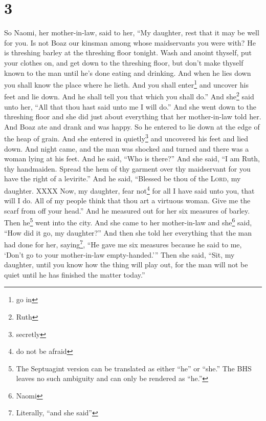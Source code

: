 \section{3}\label{Ruth 3}
\begin{enumerate}[align=center]
     So Naomi, her mother-in-law, said to her, ``My daughter, rest that it may be well for you.%
     Is not Boaz our kinsman among whose maidservants you were with? He is threshing barley at the threshing floor tonight.%
     Wash and anoint thyself, put your clothes on, and get down to the threshing floor, but don't make thyself known to the man until he's done eating and drinking.%
     And when he lies down you shall know the place where he lieth. And you shall enter\footnote{go in} and uncover his feet and lie down. And he shall tell you that which you shall do.''%
     And she\footnote{Ruth} said unto her, ``All that thou hast said unto me I will do.''%
     And she went down to the threshing floor and she did just about everything that her mother-in-law told her.%
     And Boaz ate and drank and was happy. So he entered to lie down at the edge of the heap of grain. And she entered in quietly\footnote{secretly} and uncovered his feet and lied down.%
     And night came, and the man was shocked and turned and there was a woman lying at his feet.%
     And he said, ``Who is there?'' And she said, ``I am Ruth, thy handmaiden. Spread the hem of thy garment over thy maidservant for you have the right of a levirite.''%
     And he said, ``Blessed be thou of the \textsc{Lord}, my daughter. XXXX%
     Now, my daughter, fear not\footnote{do not be afraid} for all I have said unto you, that will I do. All of my people think that thou art a virtuous woman.%
     Give me the scarf from off your head.'' And he measured out for her six measures of barley. Then he\footnote{The Septuagint version can be translated as either ``he'' or ``she.'' The BHS leaves no such ambiguity and can only be rendered as ``he.''} went into the city.%
     And she came to her mother-in-law and she\footnote{Naomi} said, ``How did it go, my daughter?'' And then she told her everything that the man had done for her,%
     saying\footnote{Literally, ``and she said''}, ``He gave me six measures because he said to me, `Don't go to your mother-in-law empty-handed.'''%
     Then she said, ``Sit, my daughter, until you know how the thing will play out, for the man will not be quiet until he has finished the matter today.''%
\end{enumerate}
